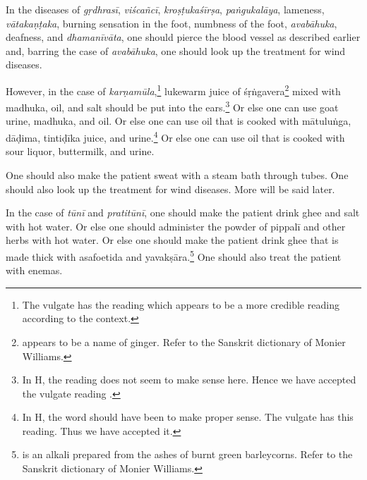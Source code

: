 \begin{translation}
\begin{tt}
\item[23]

In the diseases of \textit{gṛdhrasī}, \textit{viścañcī},
\textit{kroṣṭukaśīrṣa}, \textit{paṅgukalāya}, lameness,
\textit{vātakaṇṭaka}, burning sensation in the foot, numbness of the
foot, \textit{avabāhuka}, deafness, and \textit{dhamanīvāta}, one
should pierce the blood vessel as described earlier and, barring the
case of \textit{avabāhuka}, one should look up the treatment for wind
diseases.

\item[24]

However, in the case of \textit{karṇamūla},\footnote{The vulgate has
    the reading  which appears to be a more credible
    reading according to the context.} lukewarm juice of
    \gls{śṛṅgavera}\footnote{ appears to be a name of
        ginger. Refer to the Sanskrit dictionary of Monier Williams.} mixed
        with \gls{madhuka}, oil, and salt should be put into the
        ears.\footnote{In H, the reading  does not seem to make
            sense here. Hence we have accepted the vulgate reading .}
            Or else one can use goat urine, \gls{madhuka}, and oil. Or else one
            can use oil that is cooked with \gls{mātuluṅga}, \gls{dāḍima},
            \gls{tintiḍīka} juice, and urine.\footnote{In H, the word 
                should have been  to make proper sense. The vulgate has
                this reading. Thus we have accepted it.} Or else one can use oil that
                is cooked with sour liquor, buttermilk, and urine.

One should also make the patient sweat with a steam bath through
tubes. One should also look up the treatment for wind diseases. More
will be said later.

\item[25]

In the case of \textit{tūnī} and \textit{pratitūnī}, one should make
the patient drink ghee and salt with hot water. Or else one should
administer the powder of \gls{pippalī} and other herbs with hot water.
Or else one should make the patient drink ghee that is made thick with
asafoetida and \gls{yavakṣāra}.\footnote{ is an alkali
    prepared from the ashes of burnt green barleycorns. Refer to the
    Sanskrit dictionary of Monier Williams.} One should also treat the
    patient with enemas.

\item[26]


\end{tt}
\end{translation}
